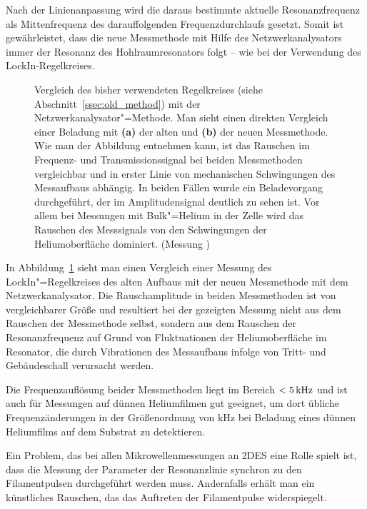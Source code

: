 Nach der Linienanpassung wird die daraus bestimmte aktuelle Resonanzfrequenz als Mittenfrequenz des darauffolgenden Frequenzdurchlaufs gesetzt. Somit ist gewährleistet, dass die neue Messmethode mit Hilfe des Netzwerkanalysators immer der Resonanz des Hohlraumresonators folgt -- wie bei der Verwendung des LockIn-Regelkreises.

\begin{figure}[h!tbp]
	\centerline{%
		\hfill%
		}
	\caption[Vergleich der bisherigen und neuen Messmethoden]{Vergleich des bisher verwendeten Regelkreises (siehe Abschnitt~\ref{ssec:old_method}) mit der Netzwerkanalysator"=Methode. Man sieht einen direkten Vergleich einer Beladung mit {\bfseries (a)} der alten und {\bfseries (b)} der neuen Messmethode. Wie man der Abbildung entnehmen kann, ist das Rauschen im Frequenz- und Transmissionssignal bei beiden Messmethoden vergleichbar und in erster Linie von mechanischen Schwingungen des Messaufbaus abhängig. In beiden Fällen wurde ein Beladevorgang durchgeführt, der im Amplitudensignal deutlich zu sehen ist. Vor allem bei Messungen mit Bulk"=Helium in der Zelle wird das Rauschen des Messsignals von den Schwingungen der Heliumoberfläche dominiert. (Messung )}
	\label{fig:alt_neu_vergleich}
\end{figure}

In Abbildung~\ref{fig:alt_neu_vergleich} sieht man einen Vergleich einer Messung des LockIn"=Regelkreises des alten Aufbaus mit der neuen Messmethode mit dem Netzwerkanalysator. Die Rauschamplitude in beiden Messmethoden ist von vergleichbarer Größe und resultiert bei der gezeigten Messung nicht aus dem Rauschen der Messmethode selbst, sondern aus dem Rauschen der Resonanzfrequenz auf Grund von Fluktuationen der Heliumoberfläche im Resonator, die durch Vibrationen des Messaufbaus infolge von Tritt- und Gebäudeschall verursacht werden.

Die Frequenzauflösung beider Messmethoden liegt im Bereich $< \unit[5]{kHz}$ und ist auch für Messungen auf dünnen Heliumfilmen gut geeignet, um dort übliche Frequenzänderungen in der Größenordnung von \unit[100]{kHz} bei Beladung eines dünnen Heliumfilms auf dem Substrat zu detektieren.

Ein Problem, das bei allen Mikrowellenmessungen an 2DES eine Rolle spielt ist, dass die Messung der Parameter der Resonanzlinie synchron zu den Filamentpulsen durchgeführt werden muss. Andernfalls erhält man ein künstliches Rauschen, das das Auftreten der Filamentpulse widerspiegelt.

